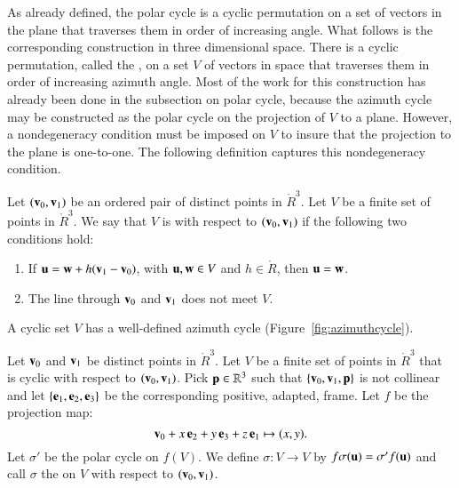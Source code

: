 As already defined, the polar cycle is a cyclic permutation on a set
of vectors in the plane that traverses them in order of increasing
angle.  What follows is the corresponding construction in three
dimensional space.  There is a cyclic permutation, called the
, on a set $V$ of vectors in space that
traverses them in order of increasing azimuth angle.  Most of the work
for this construction has already been done in the subsection on polar
cycle, because the azimuth cycle may be constructed as the polar cycle
on the projection of $V$ to a plane.  However, a nondegeneracy
condition must be imposed on $V$ to insure that the projection to the
plane is one-to-one.  The following definition captures this
nondegeneracy condition.  %
%
%
%


\begin{definition}
Let $({\mathbf v}_0,{\mathbf v}_1)$ be an ordered pair of
  distinct points in $\ring{R}^3$.  Let $V$ be a finite set of points
  in $\ring{R}^3$.  We say that $V$ is  with respect to
  $({\mathbf v}_0,{\mathbf v}_1)$ if the following two conditions hold:
\begin{enumerate}
\item If ${\mathbf u} = {\mathbf w} + h ({\mathbf v}_1-{\mathbf v}_0)$, with ${\mathbf u},{\mathbf w}\in V$ and $h\in \ring{R}$,
then ${\mathbf u}={\mathbf w}$.  
\item  The line through ${\mathbf v}_0$ and ${\mathbf v}_1$ does not meet $V$.
\end{enumerate}
\end{definition}
%

A cyclic set $V$ has a well-defined azimuth cycle (Figure~\ref{fig:azimuthcycle}).

\figHOUNZSY %

\begin{definition}
  Let ${\mathbf v}_0$ and ${\mathbf v}_1$ be distinct points in $\ring{R}^3$.  Let $V$
  be a finite set of points in $\ring{R}^3$ that is cyclic with
  respect to $({\mathbf v}_0,{\mathbf v}_1)$.  Pick ${\mathbf p}\in\mathbb{R}^3$ such that
  $\{{\mathbf v}_0,{\mathbf v}_1,{\mathbf p}\}$ is not collinear and let $\{{\mathbf e}_1,{\mathbf e}_2,{\mathbf e}_3\}$ be
  the corresponding positive, adapted, frame.  Let $f$ be the
  projection map:
\[ {\mathbf v}_0 + x\, {\mathbf e}_2 + y\, {\mathbf e}_3 + z\, {\mathbf e}_1 \mapsto
(x,y).\] 
Let $\sigma'$ be the polar cycle on $f(V)$. We define
$\sigma:V\to V$ by $f\sigma({\mathbf u}) =\sigma'f({\mathbf u})$
and call $\sigma$ the 
on $V$ with respect to $({\mathbf v}_0,{\mathbf v}_1)$.
%
%
%
%
%
\end{definition}


